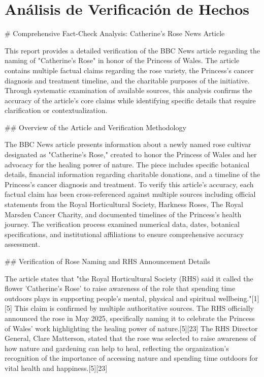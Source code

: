 \documentclass[10pt,a4paper]{article}
\begin{document}

\section*{Análisis de Verificación de Hechos}
    \# Comprehensive Fact-Check Analysis: Catherine's Rose News Article
\par\medskip
This report provides a detailed verification of the BBC News article regarding the naming of "Catherine's Rose" in honor of the Princess of Wales. The article contains multiple factual claims regarding the rose variety, the Princess's cancer diagnosis and treatment timeline, and the charitable purposes of the initiative. Through systematic examination of available sources, this analysis confirms the accuracy of the article's core claims while identifying specific details that require clarification or contextualization.
\par\medskip
\#\# Overview of the Article and Verification Methodology
\par\medskip
The BBC News article presents information about a newly named rose cultivar designated as "Catherine's Rose," created to honor the Princess of Wales and her advocacy for the healing power of nature. The piece includes specific botanical details, financial information regarding charitable donations, and a timeline of the Princess's cancer diagnosis and treatment. To verify this article's accuracy, each factual claim has been cross-referenced against multiple sources including official statements from the Royal Horticultural Society, Harkness Roses, The Royal Marsden Cancer Charity, and documented timelines of the Princess's health journey. The verification process examined numerical data, dates, botanical specifications, and institutional affiliations to ensure comprehensive accuracy assessment.
\par\medskip
\#\# Verification of Rose Naming and RHS Announcement Details
\par\medskip
The article states that "the Royal Horticultural Society (RHS) said it called the flower 'Catherine's Rose' to raise awareness of the role that spending time outdoors plays in supporting people's mental, physical and spiritual wellbeing."[1][5] This claim is confirmed by multiple authoritative sources. The RHS officially announced the rose in May 2025, specifically naming it to celebrate the Princess of Wales' work highlighting the healing power of nature.[5][23] The RHS Director General, Clare Matterson, stated that the rose was selected to raise awareness of how nature and gardening can help to heal, reflecting the organization's recognition of the importance of accessing nature and spending time outdoors for vital health and happiness.[5][23]
\end{document}
